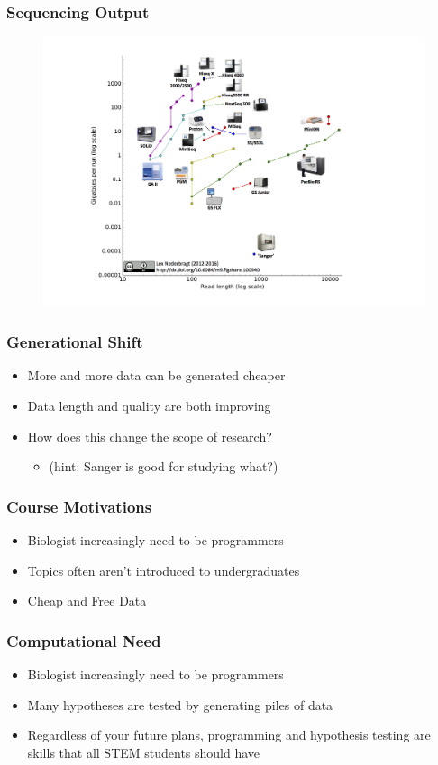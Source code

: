 \documentclass[14pt]{beamer}
\begin{document}
\begin{frame}
\frametitle{Sequencing Output}
\begin{figure}
\includegraphics[width=0.8\linewidth]{images_20170829_machine_output.jpg}
\end{figure}
\end{frame}
\begin{frame}
\frametitle{Generational Shift}
\begin{itemize}
	\item<1-> More and more data can be generated cheaper
	\item<2-> Data length and quality are both improving
	\item<3-> How does this change the scope of research?
	\begin{itemize}
		\item<4-> (hint: Sanger is good for studying what?)
	\end{itemize}
\end{itemize}
\end{frame}
\begin{frame}
\frametitle{Course Motivations}
\begin{itemize}
	\item Biologist increasingly need to be programmers
	\item Topics often aren't introduced to undergraduates
	\item Cheap and Free Data
\end{itemize}
\end{frame}
\begin{frame}
\frametitle{Computational Need}
\begin{itemize}
	\item Biologist increasingly need to be programmers
	\item Many hypotheses are tested by generating piles of data
	\item Regardless of your future plans, programming and hypothesis testing are skills that all STEM students should have
\end{itemize}
\end{frame}
\end{document}
